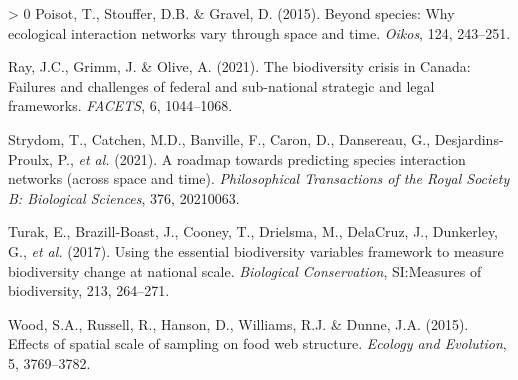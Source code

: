 \documentclass[10pt,oneside]{article}
\newlength{\cslhangindent}
\newenvironment{CSLReferences}[3] %
 {%
  \setlength{\parindent}{0pt}
  \ifodd #1 \everypar{\setlength{\hangindent}{\cslhangindent}}\ignorespaces\fi
  \ifnum #2 > 0
  \setlength{\parskip}{#2\baselineskip}
  \fi
 }%
 {}
\begin{document}
\begin{CSLReferences}{1}{0}
\leavevmode\hypertarget{ref-Poisot2015SpeWhy}{}%
Poisot, T., Stouffer, D.B. \& Gravel, D. (2015). Beyond species: Why
ecological interaction networks vary through space and time.
\emph{Oikos}, 124, 243--251.

\leavevmode\hypertarget{ref-Ray2021BioCri}{}%
Ray, J.C., Grimm, J. \& Olive, A. (2021). The biodiversity crisis in
Canada: Failures and challenges of federal and sub-national strategic
and legal frameworks. \emph{FACETS}, 6, 1044--1068.

\leavevmode\hypertarget{ref-Strydom2021RoaPre}{}%
Strydom, T., Catchen, M.D., Banville, F., Caron, D., Dansereau, G.,
Desjardins-Proulx, P., \emph{et al.} (2021). A roadmap towards
predicting species interaction networks (across space and time).
\emph{Philosophical Transactions of the Royal Society B: Biological
Sciences}, 376, 20210063.

\leavevmode\hypertarget{ref-Turak2017UsiEss}{}%
Turak, E., Brazill-Boast, J., Cooney, T., Drielsma, M., DelaCruz, J.,
Dunkerley, G., \emph{et al.} (2017). Using the essential biodiversity
variables framework to measure biodiversity change at national scale.
\emph{Biological Conservation}, SI:Measures of biodiversity, 213,
264--271.

\leavevmode\hypertarget{ref-Wood2015EffSpa}{}%
Wood, S.A., Russell, R., Hanson, D., Williams, R.J. \& Dunne, J.A.
(2015). Effects of spatial scale of sampling on food web structure.
\emph{Ecology and Evolution}, 5, 3769--3782.

\end{CSLReferences}
\end{document}
